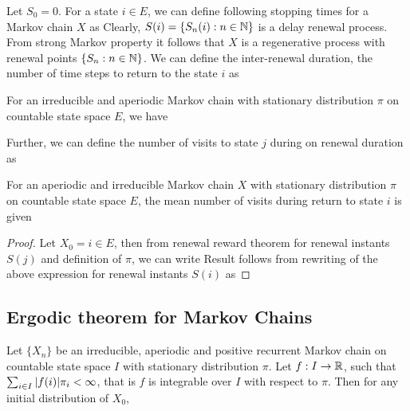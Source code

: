 \documentclass[a4paper,10pt,english]{article}
\begin{document}
Let $S_0 = 0$. 
For a state $i \in E$, we can define following stopping times for a Markov chain $X$ as 
Clearly, $S(i) = \{S_n(i): n \in \mathbb{N}\}$ is a delay renewal process. 
From strong Markov property it follows that $X$ is a regenerative process with renewal points $\{S_n: n \in \mathbb{N}\}$. 
We can define the inter-renewal duration, the number of time steps to return to the state $i$ as 
\begin{cor} 
For an irreducible and aperiodic Markov chain with stationary distribution $\pi$ on countable state space $E$, we have 
\end{cor}
Further, we can define the number of visits to state $j$ during on renewal duration as 
\begin{prop} 
For an aperiodic and irreducible Markov chain $X$ with stationary distribution $\pi$ on countable state space $E$, 
the mean number of visits during return to state $i$ is given 
\end{prop}
\begin{proof} 
Let $X_0 = i \in E$, then from renewal reward theorem for renewal instants $S(j)$ and definition of $\pi$, we can write 
Result follows from rewriting of the above expression for renewal instants $S(i)$ as 
\end{proof}

\subsection{Ergodic theorem for Markov Chains} 

\begin{prop} Let $\{X_n\}$ be an irreducible, aperiodic and positive recurrent Markov chain on countable state space $I$ with stationary distribution $\pi$. 
Let $f : I \to \mathbb{R}$, such that $\sum_{i \in I} \arrowvert f(i) \arrowvert \pi_i < \infty$, that is $f$ is integrable over $I$ with respect to $\pi$.  
Then for any initial distribution of $X_0$, 
\end{prop}
\end{document}

